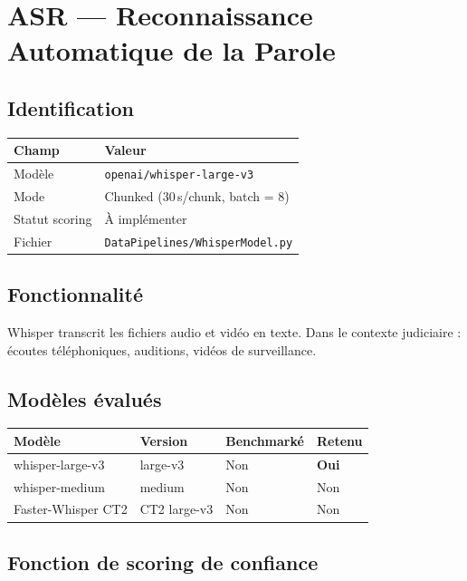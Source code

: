 \chapter{ASR --- Reconnaissance Automatique de la Parole}

\section{Identification}

\begin{center}
\begin{tabular}{ll}
\toprule
\textbf{Champ} & \textbf{Valeur} \\
\midrule
Modèle         & \texttt{openai/whisper-large-v3} \\
Mode           & Chunked (30\,s/chunk, batch = 8) \\
Statut scoring & À implémenter \\
Fichier        & \texttt{DataPipelines/WhisperModel.py} \\
\bottomrule
\end{tabular}
\end{center}

\section{Fonctionnalité}

Whisper transcrit les fichiers audio et vidéo en texte. Dans le contexte
judiciaire : écoutes téléphoniques, auditions, vidéos de surveillance.

\section{Modèles évalués}

\begin{center}
\begin{tabular}{llll}
\toprule
\textbf{Modèle} & \textbf{Version} & \textbf{Benchmarké} & \textbf{Retenu} \\
\midrule
whisper-large-v3   & large-v3      & Non  & \textbf{Oui} \\
whisper-medium     & medium        & Non  & Non \\
Faster-Whisper CT2 & CT2 large-v3  & Non  & Non \\
\bottomrule
\end{tabular}
\end{center}

\section{Fonction de scoring de confiance}

